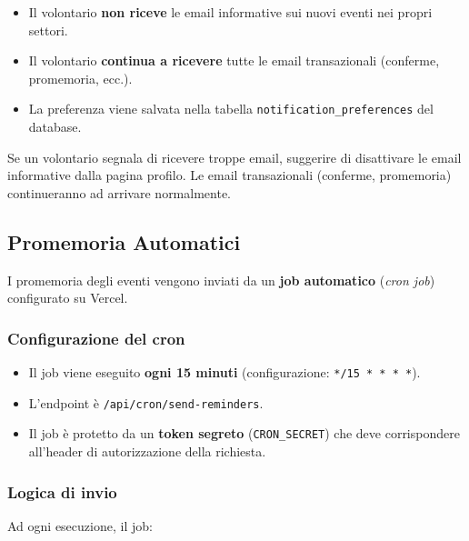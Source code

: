 \documentclass[a4paper,11pt,oneside]{book}
\newcommand{\percorso}[1]{\textcolor{namoCyan}{\texttt{#1}}}
\begin{document}
\begin{itemize}[leftmargin=1.5em]
  \item Il volontario \textbf{non riceve} le email informative sui nuovi eventi nei propri settori.
  \item Il volontario \textbf{continua a ricevere} tutte le email transazionali (conferme, promemoria, ecc.).
  \item La preferenza viene salvata nella tabella \texttt{notification\_preferences} del database.
\end{itemize}

\begin{tipbox}
Se un volontario segnala di ricevere troppe email, suggerire di disattivare le email informative dalla pagina profilo. Le email transazionali (conferme, promemoria) continueranno ad arrivare normalmente.
\end{tipbox}

\subsection{Promemoria Automatici}
\label{sec:promemoria-automatici}

I promemoria degli eventi vengono inviati da un \textbf{job automatico} (\textit{cron job}) configurato su Vercel.

\subsubsection{Configurazione del cron}

\begin{itemize}[leftmargin=1.5em]
  \item Il job viene eseguito \textbf{ogni 15 minuti} (configurazione: \texttt{*/15 * * * *}).
  \item L'endpoint \`e \percorso{/api/cron/send-reminders}.
  \item Il job \`e protetto da un \textbf{token segreto} (\texttt{CRON\_SECRET}) che deve corrispondere all'header di autorizzazione della richiesta.
\end{itemize}

\subsubsection{Logica di invio}

Ad ogni esecuzione, il job:
\end{document}
